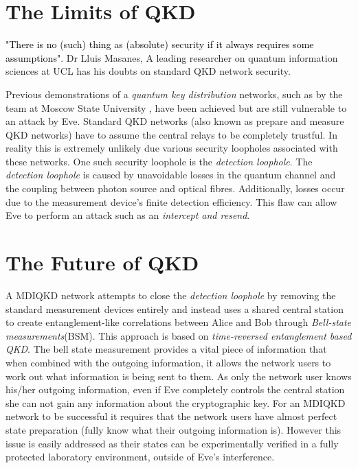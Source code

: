 \documentclass[journal]{vgtc}
\begin{document}
 


\section{The Limits of QKD}
\textcolor{black}{"There is no (such) thing as (absolute) security if it always requires some assumptions"}. Dr Lluis Masanes,  A leading researcher on quantum information sciences at UCL has his doubts on standard QKD network security.   

\vspace{0.3cm}

\noindent Previous demonstrations of a \textit{quantum key distribution} networks, such as by the team at Moscow State University\cite{2017QuEle..47..798K} , have been achieved but are still vulnerable to an attack by Eve. Standard QKD networks (also known as prepare and measure QKD networks) have to assume the central relays to be completely trustful. In reality this is extremely unlikely due various security loopholes associated with these networks. One such security loophole is the \textit{detection loophole}. The \textit{detection loophole} is caused by unavoidable losses in the quantum channel and the coupling between photon source and optical fibres. Additionally, losses occur due to the measurement device's finite detection efficiency. This flaw can allow Eve to perform an attack such as an \textit{intercept and resend}.



\section{The Future of QKD}


A MDIQKD network attempts to close the \textit{detection loophole} by removing the standard measurement devices entirely and instead uses a shared  central station to create entanglement-like correlations between Alice and Bob through \textit{Bell-state measurements}(BSM). This approach is based on \textit{time-reversed entanglement based QKD}\cite{PhysRevA.54.2651}. The bell state measurement provides a vital piece of information that when combined with the outgoing information, it allows the network users to work out what information is being sent to them. As only the network user knows his/her outgoing information, even if Eve completely controls the central station she can not gain any information about the cryptographic key. For an MDIQKD network to be successful it requires that the network users have almost perfect state preparation (fully know what their outgoing information is). However this issue is easily addressed as their states can be experimentally verified in a fully protected laboratory environment, outside of Eve's interference.  
\end{document}
